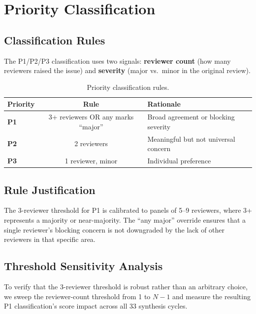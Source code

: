 \section{Priority Classification}

\subsection{Classification Rules}

The P1/P2/P3 classification uses two signals: \textbf{reviewer count} (how many reviewers raised the issue) and \textbf{severity} (major vs.\ minor in the original review).

\begin{table}[h]
\centering
\begin{tabular}{lcl}
\toprule
Priority & Rule & Rationale \\
\midrule
\textbf{P1} & 3+ reviewers OR any marks ``major'' & Broad agreement or blocking severity \\
\textbf{P2} & 2 reviewers & Meaningful but not universal concern \\
\textbf{P3} & 1 reviewer, minor & Individual preference \\
\bottomrule
\end{tabular}
\caption{Priority classification rules.}
\end{table}

\subsection{Rule Justification}

The 3-reviewer threshold for P1 is calibrated to panels of 5--9 reviewers, where 3+ represents a majority or near-majority. The ``any major'' override ensures that a single reviewer's blocking concern is not downgraded by the lack of other reviewers in that specific area.

\subsection{Threshold Sensitivity Analysis}

To verify that the 3-reviewer threshold is robust rather than an arbitrary choice, we sweep the reviewer-count threshold from 1 to $N{-}1$ and measure the resulting P1 classification's score impact across all 33 synthesis cycles.

